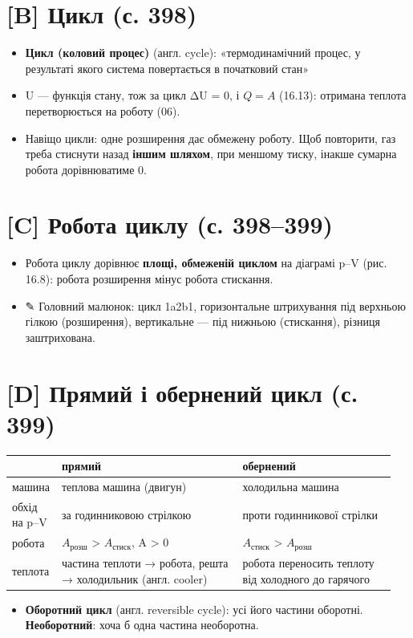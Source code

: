 \documentclass[11pt,a4paper,oneside]{book}
\newcommand{\pen}{{\sffamily\color{accent}✎}}
\begin{document}
\section*{[B] Цикл (с. 398)}
\begin{itemize}
\item \textbf{Цикл (коловий процес)} (англ. cycle): «термодинамічний процес, у результаті якого система повертається в початковий стан»
\item U — функція стану, тож за цикл ΔU = 0, і $Q = A$ (16.13): отримана теплота перетворюється на роботу (06).
\item Навіщо цикли: одне розширення дає обмежену роботу. Щоб повторити, газ треба стиснути назад \textbf{іншим шляхом}, при меншому тиску, інакше сумарна робота дорівнюватиме 0.
\end{itemize}

\section*{[C] Робота циклу (с. 398–399)}
\begin{itemize}
\item Робота циклу дорівнює \textbf{площі, обмеженій циклом} на діаграмі p–V (рис. 16.8): робота розширення мінус робота стискання.
\item \pen{} Головний малюнок: цикл 1a2b1, горизонтальне штрихування під верхньою гілкою (розширення), вертикальне — під нижньою (стискання), різниця заштрихована.
\end{itemize}

\section*{[D] Прямий і обернений цикл (с. 399)}
{\small
\begin{longtable}{>{\raggedright\arraybackslash}p{0.093\linewidth}>{\raggedright\arraybackslash}p{0.464\linewidth}>{\raggedright\arraybackslash}p{0.395\linewidth}}
\toprule
\textbf{} & \textbf{\textbf{прямий}} & \textbf{\textbf{обернений}} \\
\midrule
\endhead
машина & теплова машина (двигун) & холодильна машина \\
обхід на p–V & за годинниковою стрілкою & проти годинникової стрілки \\
робота & $A_{\text{розш}}$ > $A_{\text{стиск}}$, A > 0 & $A_{\text{стиск}}$ > $A_{\text{розш}}$ \\
теплота & частина теплоти → робота, решта → холодильник (англ. cooler) & робота переносить теплоту від холодного до гарячого \\
\bottomrule
\end{longtable}
}
\begin{itemize}
\item \textbf{Оборотний цикл} (англ. reversible cycle): усі його частини оборотні. \textbf{Необоротний}: хоча б одна частина необоротна.
\end{itemize}
\end{document}
